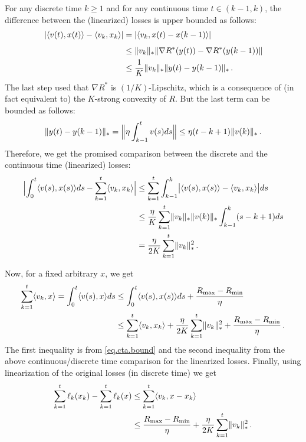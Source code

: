 \documentclass[12pt]{article}
\theoremstyle{plain}
\theoremstyle{definition}
\theoremstyle{remark}
\begin{document}
\medskip

For any discrete time $k \geq 1$ and for any continuous time $t \in (k-1,k)$,
the difference between the (linearized) losses is upper bounded as follows:
\begin{align*}
\lvert  \langle {v(t),x(t)}\rangle - \langle {v_{k},x_{k}}\rangle  \rvert
&= \lvert  \langle {v_{k}, x(t) - x(k-1)}\rangle  \rvert \\[1.5mm]
&\leq \lVert v_{k} \rVert_{*} \lVert  \nabla R^{*}(y(t)) - \nabla R^{*}(y(k-1))  \rVert \\
&\leq \frac{1}{K} \lVert v_{k} \rVert_{*} \lVert y(t) - y(k-1) \rVert_{*}\,.
\end{align*}
The last step used that $\nabla R^{*}$ is $(1/K)$-Lipschitz,
which is a consequence of (in fact equivalent to) the $K$-strong convexity of $R$.
But the last term can be bounded as follows:
$$
\lVert y(t) - y(k-1) \rVert_{*}
= \Bigl\lVert  \eta \int_{k-1}^{t} v(s) ds  \Bigr\rVert
\leq \eta (t-k+1) \lVert v(k) \rVert_{*}\,.
$$
Therefore, we get the promised comparison between the discrete and the continuous time
(linearized) losses:
\begin{align*}
\Bigl\lvert  \int_{0}^{t} \langle {v(s),x(s)}\rangle ds - \sum_{k=1}^{t} \langle {v_{k},x_{k}}\rangle  \Bigr\rvert
&\leq \sum_{k=1}^{t} \int_{k-1}^{k} \bigl\lvert  \langle {v(s),x(s)}\rangle - \langle {v_{k},x_{k}}\rangle  \bigr\rvert ds \\
&\leq \frac{\eta}{K} \sum_{k=1}^{t} \lVert v_{k} \rVert_{*} \lVert v(k) \rVert_{*} \int_{k-1}^{k} (s-k+1) ds \\
&= \frac{\eta}{2K} \sum_{k=1}^{t} \lVert v_{k} \rVert_{*}^2\,.
\end{align*}


Now, for a fixed arbitrary $x$, we get
\begin{align*}
\sum_{k=1}^{t} \langle {v_{k},x}\rangle
= \int_{0}^{t} \langle {v(s), x}\rangle ds 
&\leq \int_{0}^{t} \langle {v(s), x(s)}\rangle ds + \frac{R_{\text{max}} - R_{\text{min}}}{\eta} \\
&\leq \sum_{k=1}^{t} \langle {v_{k},x_{k}}\rangle + \frac{\eta}{2K} \sum_{k=1}^{t} \lVert v_{k} \rVert_{*}^2 
     + \frac{R_{\text{max}} - R_{\text{min}}}{\eta}\,.
\end{align*}
The first inequality is from \eqref{eq.cta.bound} and the second inequality
from the above continuous/discrete time comparison for the linearized losses.
Finally, using linearization of the original losses (in discrete time) we get
\begin{align*}
\sum_{k=1}^{t} \ell_{k}(x_{k}) - \sum_{k=1}^{t} \ell_{k}(x)
&\leq \sum_{k=1}^{t} \langle {v_{k},x - x_{k}}\rangle \\
&\leq \frac{R_{\text{max}} - R_{\text{min}}}{\eta} + \frac{\eta}{2K} \sum_{k=1}^{t} \lVert v_{k} \rVert_{*}^2\,.
\end{align*}
\end{document}
